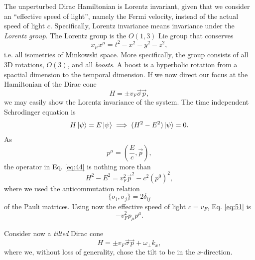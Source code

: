 The unperturbed Dirac Hamiltonian is Lorentz invariant, given that we consider an ``effective speed of light'', namely the Fermi velocity, instead of the actual speed of light \( c \).
Specifically, Lorentz invariance means invariance under the \emph{Lorentz group}.
The Lorentz group is the \( O(1,3) \) Lie group that conserves
\[
x_{\mu } x^{\mu } = t^2 - x^2 - y^2 - z^2,
\]
i.e. all isometries of Minkowski space.
More specifically, the group consists of all 3D rotations, \( O(3) \), and all \emph{boosts}.
A boost is a hyperbolic rotation from a spactial dimension to the temporal dimension.
If we now direct our focus at the Hamiltonian of the Dirac cone
\[
H = \pm v_{F} \vec{\sigma} \vec{p},
\]
we may easily show the Lorentz invariance of the system.
The time independent Schrodinger equation is
\begin{equation}
  \label{eq:44}
  H \ket{\psi } = E \ket{\psi } \implies (H^2 - E^2) \ket{\psi } = 0.
\end{equation}
As
\[
p^{\mu } = \left(\frac{E}{c}, \vec{p}\right),
\]
the operator in Eq. \eqref{eq:44} is nothing more than
\begin{equation}
  \label{eq:51}
  H^2-E^2 = v_{F}^2 \vec{p}^2 - c^2 \left(p^0\right)^2 ,
\end{equation}
where we used the anticommutation relation
\[
\{\sigma_{i}, \sigma_{j}\} =  2 \delta _{ij}
\]
of the Pauli matrices.
Using now the effective speed of light \( c=v_F \), Eq. \eqref{eq:51} is
\begin{equation}
  \label{eq:52}
  - v_F^2 p_{\mu } p^{\mu }.
\end{equation}

Consider now a \emph{tilted} Dirac cone
\begin{equation}
  \label{eq:53}
  H = \pm v_F \vec{\sigma} \vec{p} + \omega_{\perp} k_x,
\end{equation}
where we, without loss of generality, chose the tilt to be in the \( x \)-direction.




